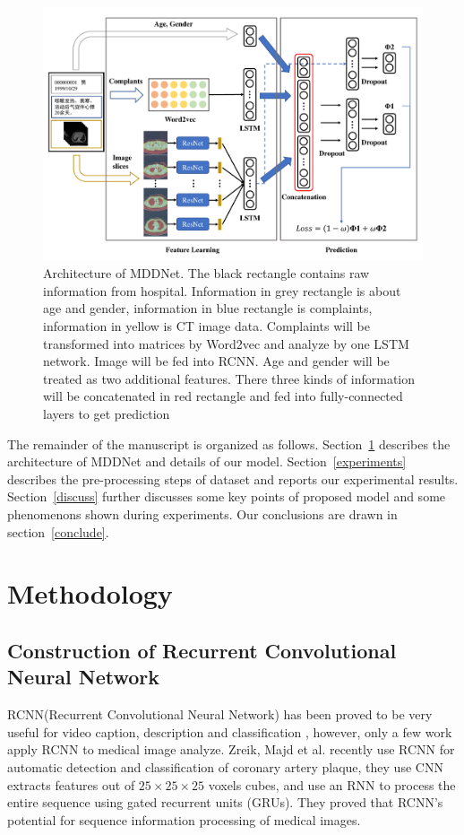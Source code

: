 \documentclass[journal]{IEEEtran}
\begin{document}
\begin{figure}[t]
    \centerline{\includegraphics[width=160mm]{MMDD.pdf}}
    \vspace{-0cm}
    \caption{Architecture of MDDNet. The black rectangle contains raw information from hospital. Information in grey rectangle is about age and gender, information in blue rectangle is complaints, information in yellow is CT image data. Complaints will be transformed into matrices by Word2vec and analyze by one LSTM network. Image will be fed into RCNN. Age and gender will be treated as two additional features. There three kinds of information will be concatenated in red rectangle and fed into fully-connected layers to get prediction}
    \vspace{-0cm}
    \label{MMDD}
    \end{figure}


The remainder of the manuscript is organized as follows. 
Section~\ref{methodology} describes the architecture of MDDNet and details of our model.
Section~\ref{experiments} describes the pre-processing steps of dataset and reports our experimental results.
Section~\ref{discuss} further discusses some key points of proposed model and some phenomenons shown during experiments.
Our conclusions are drawn in section~\ref{conclude}.

\section{Methodology}
\label{methodology}

\subsection{Construction of Recurrent Convolutional Neural Network}
\label{RCNN}
RCNN(Recurrent Convolutional Neural Network) has been proved to be very useful for video caption, description and classification \cite{Donahue2015Long}\cite{Aafaq2019Spatio}, however, only a few work apply RCNN to medical image analyze. Zreik, Majd et al. \cite{Zreik2018A} recently use RCNN for automatic detection and classification of coronary artery plaque, they use CNN extracts features out of $ 25\times25\times25$ voxels cubes, and  use an RNN to process the entire sequence using gated recurrent units (GRUs)\cite{chung2014empirical}. They proved that RCNN's potential for sequence information processing of medical images. 
\end{document}
